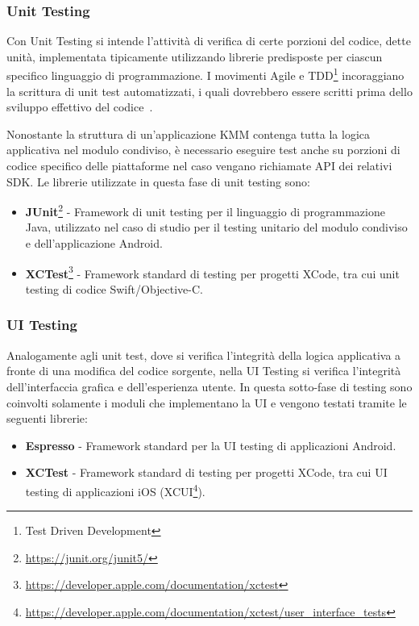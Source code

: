 \subsubsection*{Unit Testing}
Con Unit Testing si intende l’attività di verifica di certe porzioni del codice, 
dette unità, 
implementata tipicamente utilizzando librerie predisposte per ciascun specifico linguaggio di programmazione. 
I movimenti Agile e TDD\footnote{Test Driven Development} incoraggiano la scrittura di unit test automatizzati, 
i quali dovrebbero essere scritti prima dello sviluppo effettivo del codice~\cite{martin2017clean}.

Nonostante la struttura di un'applicazione KMM contenga tutta la logica applicativa nel modulo condiviso, 
è necessario eseguire test anche su porzioni di codice specifico delle piattaforme nel caso vengano richiamate API dei relativi SDK. 
Le librerie utilizzate in questa fase di unit testing sono:

\begin{itemize}
    \item \textbf{JUnit}\footnote{\href{https://junit.org/junit5/}{https://junit.org/junit5/}} - Framework di unit testing per il linguaggio di programmazione Java, utilizzato nel caso di studio per il testing unitario del modulo condiviso e dell'applicazione Android.
    
    \item \textbf{XCTest}\footnote{\href{https://developer.apple.com/documentation/xctest}{https://developer.apple.com/documentation/xctest}} - Framework standard di testing per progetti XCode, tra cui unit testing di codice Swift/Objective-C.
\end{itemize}

\subsubsection*{UI Testing}
Analogamente agli unit test, 
dove si verifica l'integrità della logica applicativa a fronte di una modifica del codice sorgente, 
nella UI Testing si verifica l'integrità dell'interfaccia grafica e dell'esperienza utente. 
In questa sotto-fase di testing sono coinvolti solamente i moduli che implementano la UI e vengono testati tramite le seguenti librerie:

\begin{itemize}
    \item \textbf{Espresso} - Framework standard per la UI testing di applicazioni Android.
    
    \item \textbf{XCTest} - Framework standard di testing per progetti XCode, tra cui UI testing di applicazioni iOS (XCUI\footnote{\href{https://developer.apple.com/documentation/xctest/user\_interface\_tests}{https://developer.apple.com/documentation/xctest/user\_interface\_tests}}).
\end{itemize}

